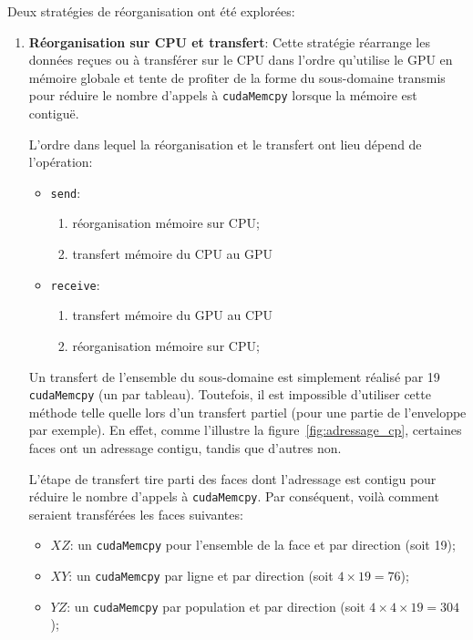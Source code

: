 Deux stratégies de réorganisation ont été explorées:
\begin{enumerate}
\item \textbf{Réorganisation sur \ac{CPU} et transfert}: Cette stratégie réarrange les données reçues ou à transférer sur le \acs{CPU} dans l'ordre qu'utilise le \acs{GPU} en mémoire globale et tente de profiter de la forme du sous-domaine transmis pour réduire le nombre d'appels à \texttt{cudaMemcpy} lorsque la mémoire est contiguë.

L'ordre dans lequel la réorganisation et le transfert ont lieu dépend de l'opération:
\begin{itemize}
\item \texttt{send}:
\begin{enumerate}
\item réorganisation mémoire sur \acs{CPU};
\item transfert mémoire du \acs{CPU} au \acs{GPU}
\end{enumerate}
\item \texttt{receive}:
\begin{enumerate}
	\item transfert mémoire du \acs{GPU} au \acs{CPU}
	\item réorganisation mémoire sur \acs{CPU};
\end{enumerate}
\end{itemize}

Un transfert de l'ensemble du sous-domaine est simplement réalisé par 19 \texttt{cudaMemcpy} (un par tableau). Toutefois, il est impossible d'utiliser cette méthode telle quelle lors d'un transfert partiel (pour une partie de l'enveloppe par exemple). En effet, comme l'illustre la figure~\ref{fig:adressage_cp}, certaines faces ont un adressage contigu, tandis que d'autres non.

L'étape de transfert tire parti des faces dont l'adressage est contigu pour réduire le nombre d'appels à \texttt{cudaMemcpy}. Par conséquent, voilà comment seraient transférées les faces suivantes:
\begin{itemize}
\item $XZ$: un \texttt{cudaMemcpy} pour l'ensemble de la face et par direction (soit 19);
\item $XY$: un \texttt{cudaMemcpy} par ligne et par direction (soit $4\times19 = 76$);
\item $YZ$: un \texttt{cudaMemcpy} par population et par direction (soit $4\times4\times19 = 304$);
\end{itemize}


\end{enumerate}
